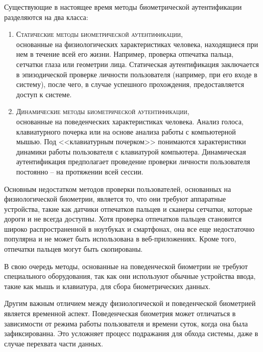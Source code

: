\documentclass[12pt]{article}
\begin{document}
    \par Существующие в настоящее время методы биометрической аутентификации разделяются на два класса:
    \begin{enumerate}
        \item \textsc{Статические методы биометрической аутентификации}, \\
        основанные на физиологических характеристиках человека, находящиеся при нем в течение всей его жизни. Например, проверка отпечатка пальца, сетчатки глаза или геометрии лица. Статическая аутентификация заключается в эпизодической проверке личности пользователя (например, при его входе в систему), после чего, в случае успешного прохождения, предоставляется доступ к системе.

        \item \textsc{Динамические методы биометрической аутентификации}, \\
        основанные на поведенческих характеристиках человека. Анализ голоса, клавиатурного почерка или на основе анализа работы с компьютерной мышью. Под <<клавиатурным почерком>> понимаются характеристики динамики работы пользователя с клавиатурой компьютера. Динамическая аутентификация предполагает проведение проверки личности пользователя постоянно -- на протяжении всей сессии.
    \end{enumerate}

    \par Основным недостатком методов проверки пользователей, основанных на физиологической биометрии, является то, что они требуют аппаратные устройства, такие как датчики отпечатков пальцев и сканеры сетчатки, которые дороги и не всегда доступны. Хотя проверка отпечатков пальцев становится широко распространенной в ноутбуках и смартфонах, она все еще недостаточно популярна и не может быть использована в веб-приложениях. Кроме того, отпечатки пальцев могут быть скопированы.

    \par В свою очередь методы, основанные на поведенческой биометрии не требуют специального оборудования, так как они используют обычные устройства ввода, такие как мышь и клавиатура, для сбора биометрических данных.

    \par Другим важным отличием между физиологической и поведенческой биометрией является временной аспект. Поведенческая биометрия может отличаться в зависимости от режима работы пользователя и времени суток, когда она была зафиксированна. Это усложняет процесс подражания для обхода системы, даже в случае перехвата части данных.
\end{document}
